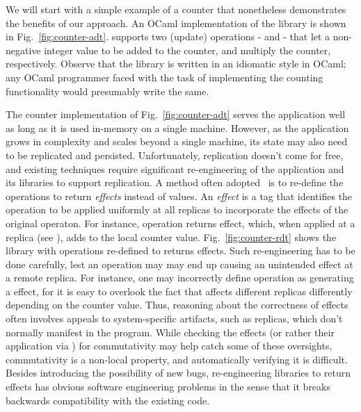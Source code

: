 We will start with a simple example of a counter that nonetheless
demonstrates the benefits of our approach. An OCaml implementation of
the  library is shown in Fig.~\ref{fig:counter-adt}.
 supports two (update) operations -  and  -
that let a non-negative integer value to be added to the counter, and
multiply the counter, respectively. Observe that the library is
written in an idiomatic style in OCaml; any OCaml programmer faced
with the task of implementing the counting functionality would
presumably write the same.  

The counter implementation of Fig.~\ref{fig:counter-adt} serves the
application well as long as it is used in-memory on a single machine.
However, as the application grows in complexity and scales beyond a
single machine, its state may also need to be replicated and
persisted. Unfortunately, replication doesn't come for free, and
existing techniques require significant re-engineering of the
application and its libraries to support replication. A method often
adopted~\cite{crdts, pldi15, gotsman-popl16} is to re-define the operations to
return \emph{effects} instead of values.  An \emph{effect} is a tag that
identifies the operation to be applied uniformly at all
replicas to incorporate the effects of the original operaton. For
instance,  operation returns  effect,
which, when applied at a replica (see ), adds  to the 
local counter value.  Fig.~\ref{fig:counter-rdt} shows the
 library with operations re-defined to returns effects.
Such re-engineering has to be done carefully, lest an operation may
may end up causing an unintended effect at a remote replica. For
instance, one may incorrectly define  operation as
generating a  effect, for it is easy to overlook the fact
that  affects different replicas differently
depending on the counter value. Thus, reasoning about the correctness
of effects often involves appeals to system-specific artifacts, such
as replicas, which don't normally manifest in the program.  While
checking the effects (or rather their application via ) for
commutativity may help catch some of these oversights, commutativity
is a non-local property, and automatically verifying it is difficult.
Besides introducing the possibility of new bugs, re-engineering
libraries to return effects has obvious software engineering problems
in the sense that it breaks backwards compatibility with the existing
code.

